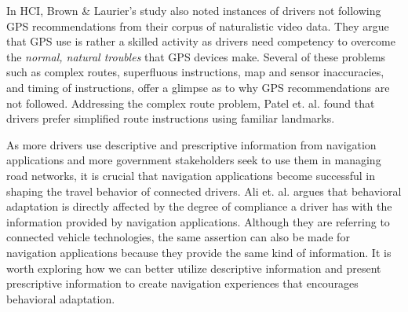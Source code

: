 In HCI, Brown \& Laurier's study \cite{Brown2012TheGPS} also noted instances of drivers not following GPS recommendations from their corpus of naturalistic video data. They argue that GPS use is rather a skilled activity as drivers need competency to overcome the \emph{normal, natural troubles} that GPS devices make. Several of these problems such as complex routes, superfluous instructions, map and sensor inaccuracies, and timing of instructions, offer a glimpse as to why GPS recommendations are not followed. Addressing the complex route problem, Patel et. al. \cite{Patel2006PersonalizingRoutes} found that drivers prefer simplified route instructions using familiar landmarks.

As more drivers use descriptive and prescriptive information from navigation applications and more government stakeholders seek to use them in managing road networks, it is crucial that navigation applications become successful in shaping the travel behavior of connected drivers. Ali et. al. \cite{Ali2018} argues that behavioral adaptation is directly affected by the degree of compliance a driver has with the information provided by navigation applications. Although they are referring to connected vehicle technologies, the same assertion can also be made for navigation applications because they provide the same kind of information. It is worth exploring how we can better utilize descriptive information and present prescriptive information to create navigation experiences that encourages behavioral adaptation.


